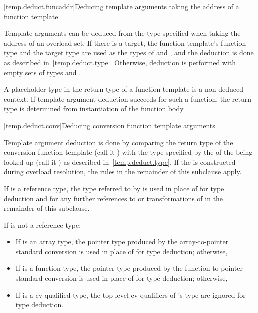 [temp.deduct.funcaddr]{Deducing template arguments taking the address of a function template}

\pnum
Template arguments can be deduced from the type specified when taking
the address of an overload set.
If there is a target,
the function template's function type and the target type
are used as the types of
and
,
and the deduction is done as
described in~\ref{temp.deduct.type}.
Otherwise, deduction is performed with empty sets of types  and .

\pnum
A placeholder type in the return type of a
function template is a non-deduced context. If template argument
deduction succeeds for such a function, the return type is determined
from instantiation of the function body.

[temp.deduct.conv]{Deducing conversion function template arguments}

\pnum
Template argument deduction is done by comparing the return type of
the
conversion function template
(call it
)
with the type specified by the  of the
 being looked up
(call it ) as described in~\ref{temp.deduct.type}.
If the  is constructed during
overload resolution,
the rules in the remainder of this subclause apply.

\pnum
If  is a reference type, the type referred to by  is used in place
of  for type deduction and for any further references to or transformations of
 in the remainder of this subclause.

\pnum
If
is not a reference type:

\begin{itemize}
\item
If
is an array type, the pointer type produced by the
array-to-pointer standard conversion is used in place of
for type
deduction; otherwise,
\item
If
is a function type, the pointer type produced by the
function-to-pointer standard conversion is used in place of
for
type deduction; otherwise,
\item
If
is a cv-qualified type, the top-level cv-qualifiers of
's
type are ignored for type deduction.
\end{itemize}

